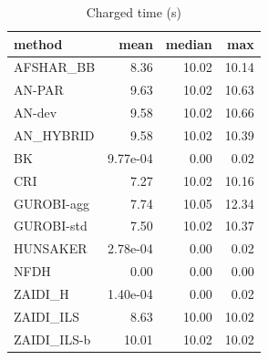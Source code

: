 \begin{table}[htbp]
\centering
\small
\caption{Charged time (s)}
\label{tab:E10a_state_of_the_art_b10_time}
\begin{tabular}{lrrr}
\toprule
method & mean & median & max \\
\midrule
AFSHAR\_BB & 8.36 & 10.02 & 10.14 \\
AN-PAR & 9.63 & 10.02 & 10.63 \\
AN-dev & 9.58 & 10.02 & 10.66 \\
AN\_HYBRID & 9.58 & 10.02 & 10.39 \\
BK & 9.77e-04 & 0.00 & 0.02 \\
CRI & 7.27 & 10.02 & 10.16 \\
GUROBI-agg & 7.74 & 10.05 & 12.34 \\
GUROBI-std & 7.50 & 10.02 & 10.37 \\
HUNSAKER & 2.78e-04 & 0.00 & 0.02 \\
NFDH & 0.00 & 0.00 & 0.00 \\
ZAIDI\_H & 1.40e-04 & 0.00 & 0.02 \\
ZAIDI\_ILS & 8.63 & 10.00 & 10.02 \\
ZAIDI\_ILS-b & 10.01 & 10.02 & 10.02 \\
\bottomrule
\end{tabular}
\end{table}
